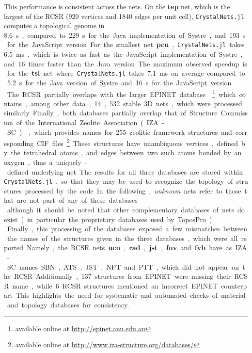 \documentclass[main.tex]{subfiles}
\begin{document}
This performance is consistent across the nets. On the \textbf{tep} net, which is the largest of the RCSR (920 vertices and 1840 edges per unit cell), \texttt{CrystalNets.jl} computes a topological genome in \SI{8.6}s, compared to \SI{229}s for the Java implementation of Systre, and \SI{193}s for the JavaScript version. For the smallest net \textbf{pcu}, \texttt{CrystalNets.jl} takes \SI{6.5}{ms}, which is twice as fast as the JavaScript implementation of Systre, and 16 times faster than the Java version. The maximum observed speedup is for the \textbf{tsl} net where \texttt{CrystalNets.jl} takes \SI{7.1}{ms} on average compared to \SI{5.2}s for the Java version of Systre and \SI{16}s for the JavaScript version.\\

The RCSR partially overlaps with the larger EPINET database \autocite{Epinet0} \footnote{available online at \url{http://epinet.anu.edu.au}} which contains, among other data, 14,532 stable 3D nets, which were processed similarly. Finally, both databases partially overlap that of Structure Commission of the International Zeolite Association (IZA-SC) \autocite{IZA}, which provides names for 255 zeolitic framework structures and corresponding CIF files.\footnote{available online at \url{http://www.iza-structure.org/databases/}} These structures have unambiguous vertices, defined by the tetrahedral atoms, and edges between two such atoms bonded by an oxygen, thus a uniquely-defined underlying net.

The results for all three databases are stored within \texttt{CrystalNets.jl}, so that they may be used to recognize the topology of structures processed by the code. In the following, \emph{unknown} nets refer to those that are not part of any of these databases --- although it should be noted that other complementary databases of nets do exist (in particular the proprietary databases used by ToposPro).\\

Finally, this processing of the databases exposed a few mismatches between the names of the structures given in the three databases, which were all reported. Namely, the RCSR nets \textbf{ucn}, \textbf{rad}, \textbf{jst}, \textbf{fuv} and \textbf{fvb} have as IZA-SC names SBN, ATS, JST, NPT and PTT, which did not appear on the RCSR. Additionally, 137 structures from EPINET were missing their RCSR name, while 6 RCSR structures mentioned an incorrect EPINET counterpart.
This highlights the need for systematic and automated checks of material and topology databases for consistency.
\end{document}
